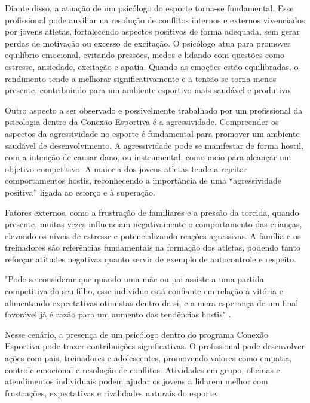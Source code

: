 \begin{Desenvolvimento}
Diante disso, a atuação de um psicólogo do esporte torna-se fundamental. Esse profissional pode auxiliar na resolução de conflitos internos e externos vivenciados por jovens atletas, fortalecendo aspectos positivos de forma adequada, sem gerar perdas de motivação ou excesso de excitação. O psicólogo atua para promover equilíbrio emocional, evitando pressões, medos e lidando com questões como estresse, ansiedade, excitação e apatia. Quando as emoções estão equilibradas, o rendimento tende a melhorar significativamente e a tensão se torna menos presente, contribuindo para um ambiente esportivo mais saudável e produtivo.

Outro aspecto a ser observado e possivelmente trabalhado por um profissional da psicologia dentro da Conexão Esportiva é a agressividade. Compreender os aspectos da agressividade no esporte é fundamental para promover um ambiente saudável de desenvolvimento. A agressividade pode se manifestar de forma hostil, com a intenção de causar dano, ou instrumental, como meio para alcançar um objetivo competitivo. A maioria dos jovens atletas tende a rejeitar comportamentos hostis, reconhecendo a importância de uma “agressividade positiva” ligada ao esforço e à superação. 

Fatores externos, como a frustração de familiares e a pressão da torcida, quando presente, muitas vezes influenciam negativamente o comportamento das crianças, elevando os níveis de estresse e potencializando reações agressivas. A família e os treinadores são referências fundamentais na formação dos atletas, podendo tanto reforçar atitudes negativas quanto servir de exemplo de autocontrole e respeito. 

\begin{citacaodiretalonga}
"Pode-se considerar que quando uma mãe ou pai assiste a uma partida competitiva do seu filho, esse indivíduo está confiante em relação à vitória e alimentando expectativas otimistas dentro de si, e a mera esperança de um final favorável já é razão para um aumento das tendências hostis" .
\end{citacaodiretalonga}

Nesse cenário, a presença de um psicólogo dentro do programa Conexão Esportiva pode trazer contribuições significativas. O profissional pode desenvolver ações com pais, treinadores e adolescentes, promovendo valores como empatia, controle emocional e resolução de conflitos. Atividades em grupo, oficinas e atendimentos individuais podem ajudar os jovens a lidarem melhor com frustrações, expectativas e rivalidades naturais do esporte.


\end{Desenvolvimento}
